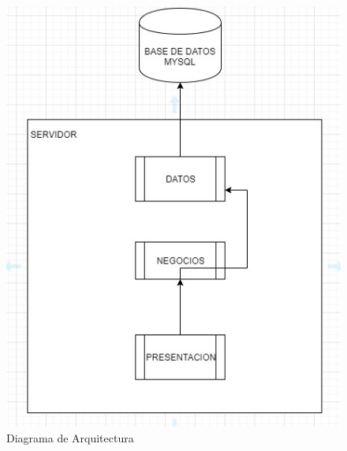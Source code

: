 \documentclass{article}
\begin{document}
\begin{figure}
    \centering
    \includegraphics{Diagrama de Arquitectura.png}
    \caption{Diagrama de Arquitectura}
    \label{fig:my_label}
\end{figure}
\end{document}
